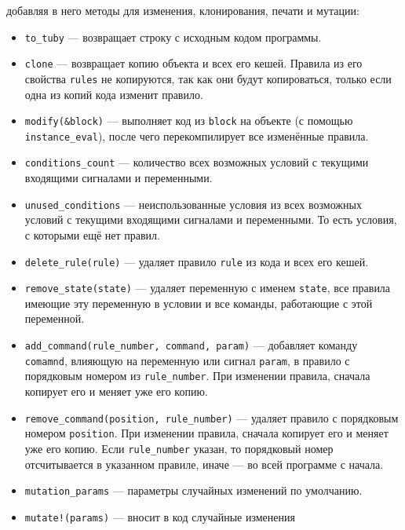 \documentclass[utf8,a5paper,portrait,10pt,twoside]{eskdtext}
\begin{document}
\begin{itemize}
       добавляя в него методы для изменения, клонирования, печати и мутации:
       \begin{itemize}
         \item \texttt{to\_tuby} — возвращает строку с исходным кодом программы.
         \item \texttt{clone} — возвращает копию объекта и всех его кешей.
               Правила из его свойства \texttt{rules} не копируются, так как они
               будут копироваться, только если одна из копий кода изменит
               правило.
         \item \texttt{modify(\&block)} — выполняет код из \texttt{block}
               на объекте (с помощью \texttt{instance\_eval}), после чего
               перекомпилирует все изменённые правила.
         \item \texttt{conditions\_count} — количество всех возможных условий
               с текущими входящими сигналами и переменными.
         \item \texttt{unused\_conditions} — неиспользованные условия из
               всех возможных условий с текущими входящими сигналами и
               переменными. То есть условия, с которыми ещё нет правил.
         \item \texttt{delete\_rule(rule)} — удаляет правило \texttt{rule} из
               кода и всех его кешей.
         \item \texttt{remove\_state(state)} — удаляет переменную с именем
               \texttt{state}, все правила имеющие эту переменную в условии и
               все команды, работающие с этой переменной.
         \item \texttt{add\_command(rule\_number, command, param)} — добавляет
               команду \texttt{comamnd}, влияющую на переменную или сигнал
               \texttt{param}, в правило с порядковым номером из
               \texttt{rule\_number}. При изменении правила, сначала копирует
               его и меняет уже его копию.
         \item \texttt{remove\_command(position, rule\_number)} — удаляет
               правило с порядковым номером \texttt{position}. При изменении
               правила, сначала копирует его и меняет уже его копию. Если
               \texttt{rule\_number} указан, то порядковый номер отсчитывается
               в указанном правиле, иначе — во всей программе с начала.
         \item \texttt{mutation\_params} — параметры случайных изменений по
               умолчанию.
         \item \texttt{mutate!(params)} — вносит в код случайные изменения

\end{itemize}
\end{itemize}
\end{document}
